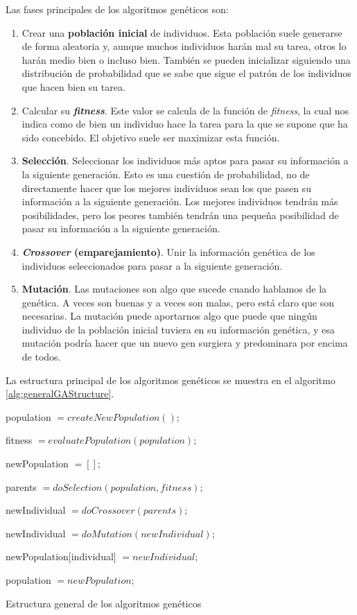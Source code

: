 Las fases principales de los algoritmos genéticos son:
\begin{enumerate}
    \item Crear una \textbf{población inicial} de individuos. Esta población suele generarse de forma aleatoria y, aunque muchos individuos harán mal su tarea, otros lo harán medio bien o incluso bien. También se pueden inicializar siguiendo una distribución de probabilidad que se sabe que sigue el patrón de los individuos que hacen bien su tarea.
    \item Calcular su \textbf{\textit{fitness}}. Este valor se calcula de la función de \textit{fitness}, la cual nos indica como de bien un individuo hace la tarea para la que se supone que ha sido concebido. El objetivo suele ser maximizar esta función.
    \item \textbf{Selección}. Seleccionar los individuos más aptos para pasar su información a la siguiente generación. Esto es una cuestión de probabilidad, no de directamente hacer que los mejores individuos sean los que pasen su información a la siguiente generación. Los mejores individuos tendrán más posibilidades, pero los peores también tendrán una pequeña posibilidad de pasar su información a la siguiente generación.
    \item \textbf{\textit{Crossover} (emparejamiento)}. Unir la información genética de los individuos seleccionados para pasar a la siguiente generación.
    \item \textbf{Mutación}. Las mutaciones son algo que sucede cuando hablamos de la genética. A veces son buenas y a veces son malas, pero está claro que son necesarias. La mutación puede aportarnos algo que puede que ningún individuo de la población inicial tuviera en su información genética, y esa mutación podría hacer que un nuevo gen surgiera y predominara por encima de todos.
    \label{enum:geneticAlgorithmSteps}
\end{enumerate}

La estructura principal de los algoritmos genéticos se muestra en el algoritmo \ref{alg:generalGAStructure}.

\vspace{2mm}
\begin{algorithm}[H]
    population $= createNewPopulation();$
    
    {
        fitness $= evaluatePopulation(population);$
        
        newPopulation $= [];$
        
        {
            parents $= doSelection(population, fitness);$
            
            newIndividual $= doCrossover(parents);$
            
            newIndividual $= doMutation(newIndividual);$
            
            newPopulation[individual] $= newIndividual;$
        }
        
        population $= newPopulation;$
    }
	\caption{Estructura general de los algoritmos genéticos}
	\label{alg:generalGAStructure}
\end{algorithm}
\vspace{2mm}

